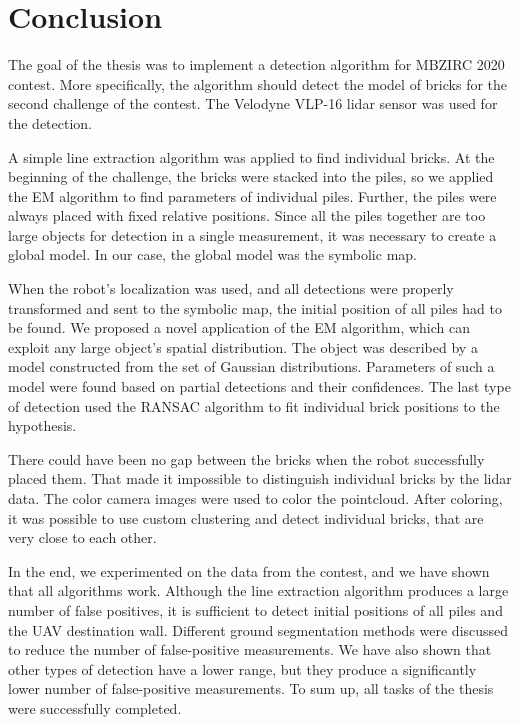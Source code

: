 \chapter{Conclusion}
\label{ch:conclusion}
The goal of the thesis was to implement a detection algorithm for MBZIRC 2020 contest. More specifically, the algorithm should detect the model of bricks for the second challenge of the contest. The Velodyne VLP-16 lidar sensor was used for the detection. 

A simple line extraction algorithm was applied to find individual bricks. At the beginning of the challenge, the bricks were stacked into the piles, so we applied the EM algorithm to find parameters of individual piles. Further, the piles were always placed with fixed relative positions. Since all the piles together are too large objects for detection in a single measurement, it was necessary to create a global model. In our case, the global model was the symbolic map.

When the robot's localization was used, and all detections were properly transformed and sent to the symbolic map, the initial position of all piles had to be found. We proposed a novel application of the EM algorithm, which can exploit any large object’s spatial distribution. The object was described by a model constructed from the set of Gaussian distributions. Parameters of such a model were found based on partial detections and their confidences. The last type of detection used the RANSAC algorithm to fit individual brick positions to the hypothesis.

There could have been no gap between the bricks when the robot successfully placed them. That made it impossible to distinguish individual bricks by the lidar data. The color camera images were used to color the pointcloud. After coloring, it was possible to use custom clustering and detect individual bricks, that are very close to each other.

In the end, we experimented on the data from the contest, and we have shown that all algorithms work. Although the line extraction algorithm produces a large number of false positives, it is sufficient to detect initial positions of all piles and the UAV destination wall. Different ground segmentation methods were discussed to reduce the number of false-positive measurements. We have also shown that other types of detection have a lower range, but they produce a significantly lower number of false-positive measurements. To sum up, all tasks of the thesis were successfully completed.